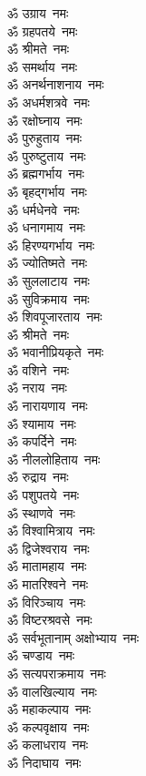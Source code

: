 \begin{multicols}{2}
\begin{flushleft}
ॐ उग्राय~नमः\\
ॐ ग्रहपतये~नमः\\
ॐ श्रीमते~नमः\\
ॐ समर्थाय~नमः\\
ॐ अनर्थनाशनाय~नमः\\
ॐ अधर्मशत्रवे~नमः\\
ॐ रक्षोघ्नाय~नमः\\
ॐ पुरुहुताय~नमः\hfill{}\\
ॐ पुरुष्टुताय~नमः\\
ॐ ब्रह्मगर्भाय~नमः\\
ॐ बृहद्गर्भाय~नमः\\
ॐ धर्मधेनवे~नमः\\
ॐ धनागमाय~नमः\\
ॐ हिरण्यगर्भाय~नमः\\
ॐ ज्योतिष्मते~नमः\\
ॐ सुललाटाय~नमः\\
ॐ सुविक्रमाय~नमः\\
ॐ शिवपूजारताय~नमः\hfill{}\\
ॐ श्रीमते~नमः\\
ॐ भवानीप्रियकृते~नमः\\
ॐ वशिने~नमः\\
ॐ नराय~नमः\\
ॐ नारायणाय~नमः\\
ॐ श्यामाय~नमः\\
ॐ कपर्दिने~नमः\\
ॐ नीललोहिताय~नमः\\
ॐ रुद्राय~नमः\\
ॐ पशुपतये~नमः\hfill{}\\
ॐ स्थाणवे~नमः\\
ॐ विश्वामित्राय~नमः\\
ॐ द्विजेश्वराय~नमः\\
ॐ मातामहाय~नमः\\
ॐ मातरिश्वने~नमः\\
ॐ विरिञ्चाय~नमः\\
ॐ विष्टरश्रवसे~नमः\\
ॐ सर्वभूतानाम् अक्षोभ्याय~नमः\\
ॐ चण्डाय~नमः\\
ॐ सत्यपराक्रमाय~नमः\hfill{}\\
ॐ वालखिल्याय~नमः\\
ॐ महाकल्पाय~नमः\\
ॐ कल्पवृक्षाय~नमः\\
ॐ कलाधराय~नमः\\
ॐ निदाघाय~नमः\\

\end{flushleft}
\end{multicols}
